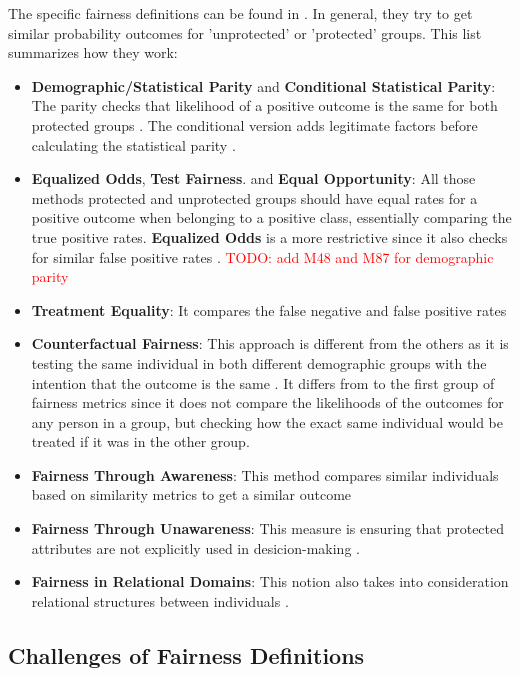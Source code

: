 \documentclass[12pt, a4paper, oneside]{book}   	%
\renewcommand{\todo}[1]{\textcolor{red}{TODO: #1}}
\begin{document}
			The specific fairness definitions can be found in \cite{Mehrabi_2021}. In general, they try to get similar probability outcomes for 'unprotected' or 'protected' groups. This list summarizes how they work:
			\begin{itemize}
				\item \textbf{Demographic/Statistical Parity} and \textbf{Conditional Statistical Parity}: The parity checks that likelihood of a positive outcome is the same for both protected groups \autocite{Mehrabi_2021}. The conditional version adds legitimate factors before calculating the statistical parity \autocite{M41_Corbett-Davies_2017}.
				\item \textbf{Equalized Odds}, \textbf{Test Fairness}. and \textbf{Equal Opportunity}: All those methods protected and unprotected groups should have equal rates for a positive outcome when belonging to a positive class, essentially comparing the true positive rates. \textbf{Equalized Odds} is a more restrictive since it also checks for similar false positive rates \autocites{M149_Verma_2018}{Mehrabi_2021}. \todo{add M48 and M87 for demographic parity}
				\item \textbf{Treatment Equality}: It compares the false negative and false positive rates \autocite{M151_Wang_2014}
				\item \textbf{Counterfactual Fairness}: This approach is different from the others as it is testing the same individual in both different demographic groups with the intention that the outcome is the same \autocites{M87_Kusner_2017}{Mehrabi_2021}. It differs from to the first group of fairness metrics since it does not compare the likelihoods of the outcomes for any person in a group, but checking how the exact same individual would be treated if it was in the other group.
				\item \textbf{Fairness Through Awareness}: This method compares similar individuals based on similarity metrics to get a similar outcome \autocite{Mehrabi_2021}
				\item \textbf{Fairness Through Unawareness}: This measure is ensuring that protected attributes are not explicitly used in desicion-making \autocite{M61_Grgic-Hlaca_2016, M87_Kusner_2017}.
				\item \textbf{Fairness in Relational Domains}: This notion also takes into consideration relational structures between individuals \autocite{M50_Farnadi_2018}.
			\end{itemize}
			
			\subsection{Challenges of Fairness Definitions}
			
\end{document}
